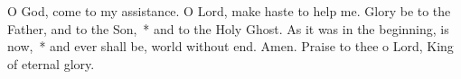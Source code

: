 \begin{enpars}
\noindent O God, \cc{} come to my assistance. \rr O Lord, make haste to help me. Glory be to the Father, and to the Son,~* and to the Holy Ghost. As it was in the beginning, is now,~* and ever shall be, world without end. Amen. Praise to thee o Lord, King of eternal glory.
\end{enpars}